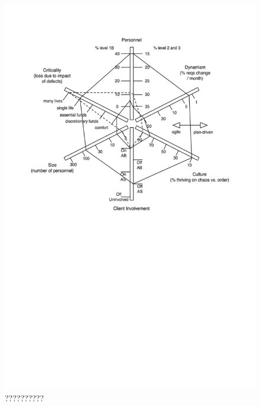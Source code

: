 \begin{figure}
\centerline{\includegraphics[scale=0.9]{include/relatedwork/fig/taylor_6axes.pdf}}
\caption{??????????} 
\label{??????}
\end{figure}

